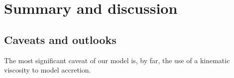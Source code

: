 \section{Summary and discussion}\label{summary}


\subsection{Caveats and outlooks}\label{caveats}
The most significant caveat of our model is, by far, the use of 
a kinematic viscosity to model accretion.   
